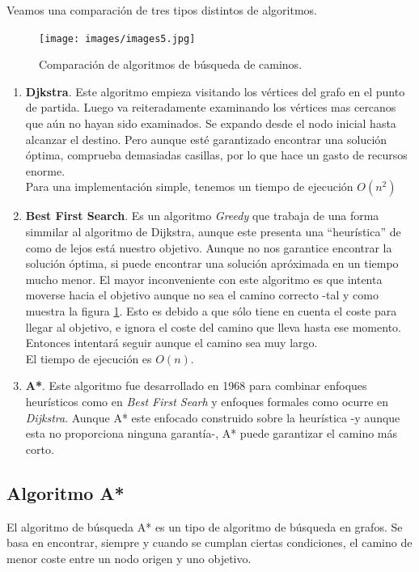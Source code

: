\documentclass[a4paper,12pt,oneside]{book}
\begin{document}
Veamos una comparación de tres tipos distintos de algoritmos.
\begin{figure}[!h]
  \centering
  \texttt{[image: images/images5.jpg]}\label{comp}
  \caption{Comparación de algoritmos de búsqueda de caminos.}
\end{figure}

\begin{enumerate}
\item {\bf Djkstra}. Este algoritmo empieza visitando los vértices del
  grafo en el punto de partida. Luego va reiteradamente examinando los
  vértices mas cercanos que aún no hayan sido examinados. Se expando
  desde el nodo inicial hasta alcanzar el destino. Pero aunque esté
  garantizado encontrar una solución óptima, comprueba demasiadas
  casillas, por lo que hace un gasto de recursos enorme.\\
  Para una implementación simple, tenemos un tiempo de ejecución $O(n^2)$
\item {\bf Best First Search}. Es un algoritmo {\it Greedy} que
  trabaja de una forma simmilar al algoritmo de Dijkstra, aunque este
  presenta una ``heurística'' de como de lejos está nuestro
  objetivo. Aunque no nos garantice encontrar la solución óptima, si
  puede encontrar una solución apróximada en un tiempo mucho menor. El
  mayor inconveniente con este algoritmo es que intenta moverse hacia
  el objetivo aunque no sea el camino correcto -tal y como muestra la
  figura \ref{comp}. Esto es debido a que sólo tiene en cuenta el
  coste para llegar al objetivo, e ignora el coste del camino que
  lleva hasta ese momento. Entonces intentará seguir aunque el camino
  sea muy largo.\\
  El tiempo de ejecución es $O(n)$.
\item {\bf A*}. Este algoritmo fue desarrollado en 1968 para combinar
  enfoques heurísticos como en {\it Best First Searh} y enfoques
  formales como ocurre en {\it Dijkstra}. Aunque A* este enfocado
  construido sobre la heurística -y aunque esta no proporciona ninguna
  garantía-, A* puede garantizar el camino más corto.
\end{enumerate}

\subsection{Algoritmo A*}
El algoritmo de búsqueda A* es un tipo de algoritmo de búsqueda en
grafos. Se basa en encontrar, siempre y cuando se cumplan ciertas
condiciones, el camino de menor coste entre un nodo origen y uno
objetivo.\\
\end{document}
